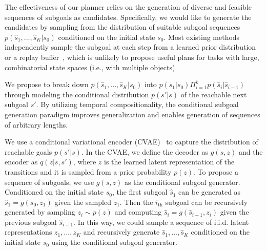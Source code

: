 
The effectiveness of our planner relies on the generation of diverse and feasible sequences of subgoals as candidates. Specifically, we would like to generate the candidates by sampling from the distribution of suitable subgoal sequences $p(\hat{s}_1, ..., \hat{s}_K | s_0)$ conditioned on the initial state $s_0$. Most existing methods
independently sample the subgoal at each step from a learned prior distribution~\cite{Pertsch2020LongHorizonVP} or a replay buffer~\cite{Eysenbach2019SearchOT}, which is unlikely to propose useful plans for tasks with large, combinatorial state spaces (i.e., with multiple objects).

We propose to break down $p(\hat{s}_1, ..., \hat{s}_K | s_0)$ into $p(\hat{s}_1 | s_0) \Pi_{i=1}^k p(\hat{s}_i | \hat{s}_{i - 1})$ through modeling the conditional distribution $p(s' | s)$ of the reachable next subgoal $s'$. By utilizing temporal compositionality, the conditional subgoal generation paradigm improves generalization and enables generation of sequences of arbitrary lengths.

We use a conditional variational encoder (CVAE)~\cite{sohn2015cvae} to capture the distribution of reachable goals $p(s' | s)$. In the CVAE, we define the decoder as $g(s, z)$ and the encoder as $q(z | s, s')$, where $z$ is the learned latent representation of the transitions and it is sampled from a prior probability $p(z)$. To propose a sequence of subgoals, we use $g(s, z)$ as the conditional subgoal generator. Conditioned on the initial state $s_0$, the first subgoal $\hat{s}_1$ can be generated as $\hat{s}_1 = g(s_0, z_1)$ given the sampled $z_1$. Then the $i_\text{th}$ subgoal can be recursively generated by sampling $z_i \sim p(z)$ and computing $\hat{s}_i = g(\hat{s}_{i - 1}, z_i)$ given the previous subgoal $\hat{s}_{i - 1}$. In this way, we could sample a sequence of i.i.d. latent representations $z_1, ..., z_K$ and recursively generate $\hat{s}_1, ..., \hat{s}_K$ conditioned on the initial state $s_0$ using the conditional subgoal generator.

